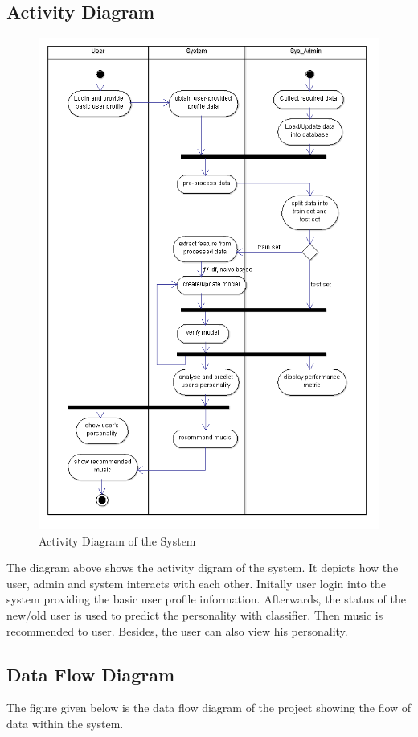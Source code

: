 \subsection{Activity Diagram}
\begin{figure}[!ht]
\centering
\includegraphics[width = 12 cm]{fig/Activity.png}
\caption{Activity Diagram of the System}
\label{fig:activity}
\end{figure}
The diagram above shows the activity digram of the system. It depicts how the user, admin and system interacts with each other. Initally user login into the system providing the basic user profile information. Afterwards, the status of the new/old user is used to predict the personality with classifier. Then music is recommended to user. Besides, the user can also view his personality.

\newpage
\subsection{Data Flow Diagram}
The figure given below is the data flow diagram of the project showing the flow of data within the system. 

